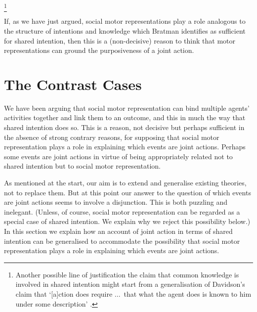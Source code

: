 \documentclass[12pt,\papersize]{extarticle}
\begin{document}
\footnote{
Another possible line of justification the claim that common knowledge is involved in shared intention might start from a generalisation of Davidson's claim that
`[a]ction does require %
...\ that what the agent does is known to him under some description' \citep[p.\ 50]{Davidson:1971fz}.
} 

If, as we have just argued, social motor representations play a role analogous to the structure of intentions and knowledge which Bratman identifies as sufficient for shared intention, then this is a  (non-decisive)  reason to think that motor representations can ground the purposiveness of a joint action.


\section{The Contrast Cases}
We have been arguing that social motor representation can bind multiple agents' activities together and link them to an outcome, and this in much the way that shared intention does  so.
This is a reason, 
not decisive but perhaps sufficient in the absence of strong contrary reasons, 
for supposing that social motor representation plays a role in explaining which events are joint actions.
Perhaps some events are joint actions in virtue of being appropriately related not to shared intention but to social motor representation.

As mentioned at the start, our aim is to extend and generalise existing theories, not to replace them. 
But at this point our answer to the question of which events are joint actions seems to involve a disjunction.
This is both puzzling and inelegant. 
(Unless, of course, social motor representation can be regarded as a special case of shared intention.  
We explain why we reject this possibility below.)
In this section we explain how an account of joint action in terms of shared intention can be generalised to accommodate the possibility that social motor representation plays a role in explaining which events are joint actions.
\end{document}
